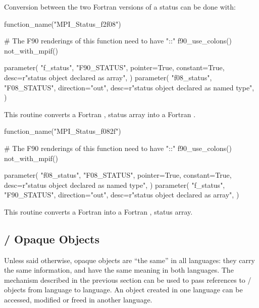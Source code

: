 Conversion between the two Fortran versions of a status can be done with:

\label{sec:conversion:status:status_f2f08}
\begin{mpi-binding}
    function_name("MPI_Status_f2f08")

    # The F90 renderings of this function need to have "::"
    f90_use_colons()
    not_with_mpif()

    parameter(
        "f_status",
        "F90_STATUS",
        pointer=True,
        constant=True,
        desc=r"status object declared as array",
    )
    parameter(
        "f08_status",
        "F08_STATUS",
        direction="out",
        desc=r"status object declared as named type",
    )
\end{mpi-binding}

This routine converts a Fortran ,  status array
into a Fortran  .

\begin{mpi-binding}
    function_name("MPI_Status_f082f")

    # The F90 renderings of this function need to have "::"
    f90_use_colons()
    not_with_mpif()

    parameter(
        "f08_status",
        "F08_STATUS",
        pointer=True,
        constant=True,
        desc=r"status object declared as named type",
    )
    parameter(
        "f_status",
        "F90_STATUS",
        direction="out",
        desc=r"status object declared as array",
    )
\end{mpi-binding}

This routine converts a Fortran  
into a Fortran ,  status array.

\subsection{\texorpdfstring{\MPI/}{MPI} Opaque Objects}
\label{subsec:mpiopaqueobjects}

Unless said otherwise, opaque objects are ``the same'' in all languages:
they carry the same information, and have the same meaning in both
languages.  The mechanism described in the previous section can be
used to pass references to \MPI/ objects from language to language.
An object created in one language can be accessed, modified or freed
in another language.

